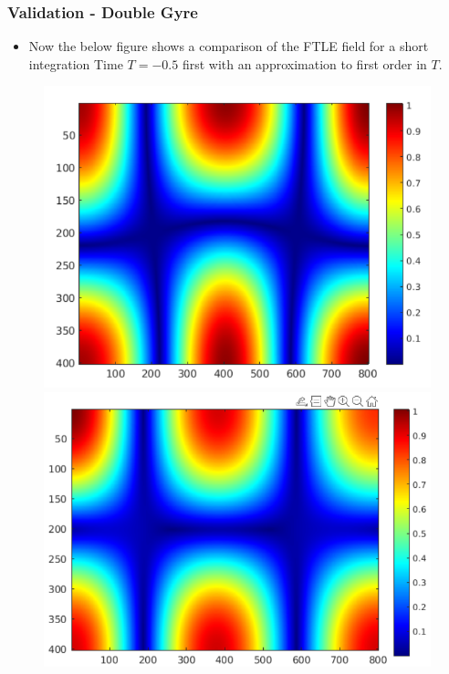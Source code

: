 \documentclass[../presentation.tex]{subfiles}
\begin{document}
\begin{frame}
  \frametitle{Validation - Double Gyre}

  \begin{itemize}
    \item Now the below figure shows a comparison of the FTLE field for a short integration Time \(T = -0.5\) first with an approximation to first order in \(T\).
  \end{itemize}

  \begin{figure}[H]
    \centering
    \begin{minipage}{.5\textwidth}
        \centering
        \includegraphics[width=\linewidth]{images/figure7.png}
    \end{minipage}%
    \begin{minipage}{0.5\textwidth}
        \centering
        \includegraphics[width=\linewidth]{images/figure8.png}
    \end{minipage}
    \label{fig:fig_3}
  \end{figure}
\end{frame}
\end{document}
